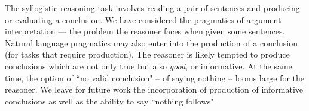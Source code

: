 \documentclass[10pt,letterpaper]{article}
\begin{document}


The syllogistic reasoning task involves reading a pair of sentences and producing or evaluating a conclusion. We have considered the pragmatics of argument interpretation --- the problem the reasoner faces when given some sentences. Natural language pragmatics may also enter into the production of a conclusion (for tasks that require production). The reasoner is likely tempted to produce conclusions which are not only true but also \emph{good}, or informative. At the same time, the option of ``no valid conclusion" -- of saying nothing -- looms large for the reasoner. We leave for future work the incorporation of production of informative conclusions as well as the ability to say ``nothing follows".



\end{document}
